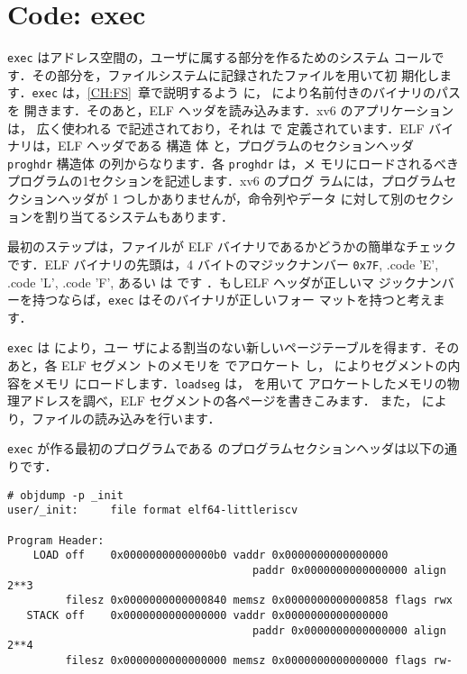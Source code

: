 \section{Code: exec}
\lstinline{exec} はアドレス空間の，ユーザに属する部分を作るためのシステム
コールです．その部分を，ファイルシステムに記録されたファイルを用いて初
期化します．\lstinline{exec}  は，\ref{CH:FS}~章で説明するよう
に，  により名前付きのバイナリのパスを
開きます．そのあと，ELF ヘッダを読み込みます．xv6 のアプリケーションは，
広く使われる で記述されており，それは  で
定義されています．ELF バイナリは，ELF ヘッダである  構造
体  と，プログラムのセクションヘッダ \lstinline{proghdr}
構造体  の列からなります．各 \lstinline{proghdr} は，メ
モリにロードされるべきプログラムの1セクションを記述します．xv6 のプログ
ラムには，プログラムセクションヘッダが 1 つしかありませんが，命令列やデータ
に対して別のセクションを割り当てるシステムもあります．

最初のステップは，ファイルが ELF バイナリであるかどうかの簡単なチェック
です．ELF バイナリの先頭は，4 バイトのマジックナンバー \lstinline{0x7F},
.code 'E',
.code 'L',
.code 'F',
あるい
は  です 
．もしELF ヘッダが正しいマ
ジックナンバーを持つならば，\lstinline{exec} はそのバイナリが正しいフォー
マットを持つと考えます．

\lstinline{exec} は   により，ユー
ザによる割当のない新しいページテーブルを得ます．そのあと，各 ELF セグメン
トのメモリを   でアロケート
し，  によりセグメントの内容をメモリ
にロードします．\lstinline{loadseg} は， を用いて
アロケートしたメモリの物理アドレスを調べ，ELF セグメントの各ページを書きこみます．
また， により，ファイルの読み込みを行います．

\lstinline{exec} が作る最初のプログラムである
 のプログラムセクションヘッダは以下の通りです．
%
\begin{footnotesize}
\begin{verbatim}
# objdump -p _init
user/_init:     file format elf64-littleriscv

Program Header:
    LOAD off    0x00000000000000b0 vaddr 0x0000000000000000 
                                      paddr 0x0000000000000000 align 2**3
         filesz 0x0000000000000840 memsz 0x0000000000000858 flags rwx
   STACK off    0x0000000000000000 vaddr 0x0000000000000000 
                                      paddr 0x0000000000000000 align 2**4
         filesz 0x0000000000000000 memsz 0x0000000000000000 flags rw-
\end{verbatim}
\end{footnotesize}

